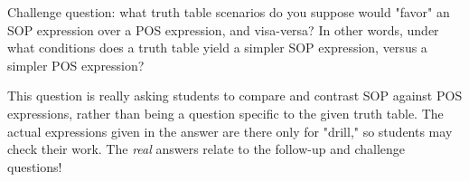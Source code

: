 \vskip 10pt

Challenge question: what truth table scenarios do you suppose would "favor" an SOP expression over a POS expression, and visa-versa?  In other words, under what conditions does a truth table yield a simpler SOP expression, versus a simpler POS expression?







This question is really asking students to compare and contrast SOP against POS expressions, rather than being a question specific to the given truth table.  The actual expressions given in the answer are there only for "drill," so students may check their work.  The {\it real} answers relate to the follow-up and challenge questions!




